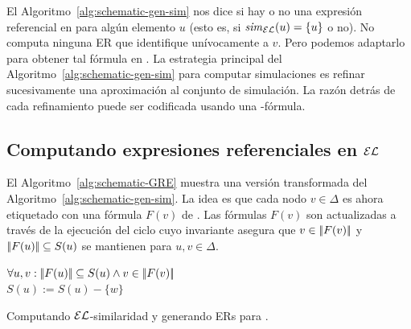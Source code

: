 El Algoritmo~\ref{alg:schematic-gen-sim} nos dice si hay o no una expresi\'on referencial en \EL para alg\'un elemento $u$ (esto es, si
${\it sim}_{\mathcal{EL}}(u) = \{u\}$ o no). No computa ninguna ER que identifique un\'ivocamente a $v$. Pero
podemos adaptarlo para obtener tal f\'ormula en \EL.
La estrategia principal del Algoritmo~\ref{alg:schematic-gen-sim} para computar simulaciones es refinar sucesivamente una aproximaci\'on al conjunto de simulaci\'on.
La raz\'on detr\'as de cada refinamiento puede ser codificada usando una \EL-f\'ormula.

\subsection{Computando expresiones referenciales en $\mathcal{EL}$}
\label{sec:computandoEnEL}

El Algoritmo~\ref{alg:schematic-GRE} muestra una versi\'on transformada del 
Algoritmo~\ref{alg:schematic-gen-sim}. La idea es que cada nodo
$v\in\Delta$ es ahora etiquetado con una f\'ormula
$F(v)$ de \EL. Las f\'ormulas $F(v)$ son actualizadas a trav\'es de la ejecuci\'on del ciclo cuyo invariante asegura que $v \in
|\!|F(v)|\!|$ y $|\!|F(u)|\!| \subseteq S(u)$ se mantienen para
$u,v\in\Delta$.\\

\begin{megaalgorithm}\small
\io


\While{\guard}
{
  $\forall u,v: |\!|F(u)|\!| \subseteq S(u)\wedge v \in |\!|F(v)|\!|$\\
$S(u):=S(u)-\{w\}$ \label{alg:line:loop-body-begin}

} \caption{\small
Computando $\mathcal{EL}$-similaridad y generando ERs para \EL.}\label{alg:schematic-GRE}
\end{megaalgorithm}

